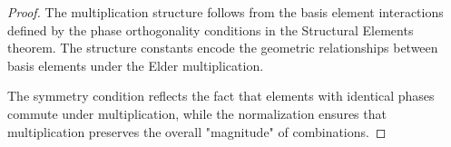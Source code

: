 \begin{proof}
The multiplication structure follows from the basis element interactions defined by the phase orthogonality conditions in the Structural Elements theorem. The structure constants encode the geometric relationships between basis elements under the Elder multiplication.

The symmetry condition reflects the fact that elements with identical phases commute under multiplication, while the normalization ensures that multiplication preserves the overall "magnitude" of combinations.
\end{proof}